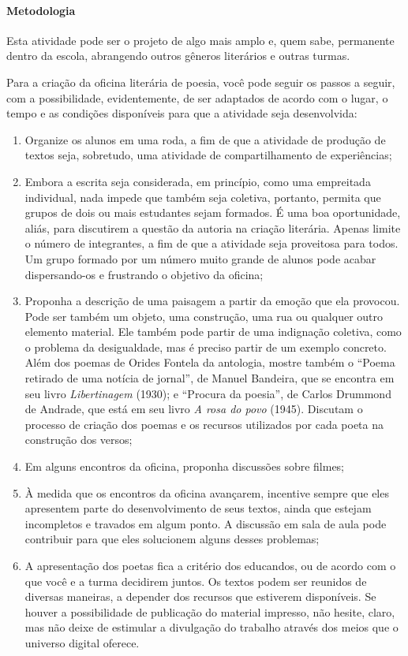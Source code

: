 \documentclass[12pt]{extarticle}
\begin{document}
\paragraph{Metodologia} Esta atividade pode ser o projeto de algo mais
amplo e, quem sabe, permanente dentro da escola, abrangendo outros
gêneros literários e outras turmas.

Para a criação da oficina literária de poesia, você pode seguir os
passos a seguir, com a possibilidade, evidentemente, de ser adaptados de
acordo com o lugar, o tempo e as condições disponíveis para que a
atividade seja desenvolvida:

\begin{enumerate}
\item
  Organize os alunos em uma roda, a fim de que a atividade de produção
  de textos seja, sobretudo, uma atividade de compartilhamento de
  experiências;
\item
  Embora a escrita seja considerada, em princípio, como uma empreitada
  individual, nada impede que também seja coletiva, portanto, permita
  que grupos de dois ou mais estudantes sejam formados. É uma boa
  oportunidade, aliás, para discutirem a questão da autoria na criação
  literária. Apenas limite o número de integrantes, a fim de que a
  atividade seja proveitosa para todos. Um grupo formado por um número
  muito grande de alunos pode acabar dispersando-os e frustrando o
  objetivo da oficina;
\item
  Proponha a descrição de uma paisagem a partir da emoção que ela
  provocou. Pode ser também um objeto, uma construção, uma rua ou
  qualquer outro elemento material. Ele também pode partir de uma
  indignação coletiva, como o problema da desigualdade, mas é preciso
  partir de um exemplo concreto. Além dos poemas de Orides Fontela da
  antologia, mostre também o ``Poema retirado de uma notícia de
  jornal'', de Manuel Bandeira, que se encontra em seu livro
  \emph{Libertinagem} (1930); e ``Procura da poesia'', de Carlos
  Drummond de Andrade, que está em seu livro \emph{A rosa do povo}
  (1945). Discutam o processo de criação dos poemas e os recursos
  utilizados por cada poeta na construção dos versos;
\item
  Em alguns encontros da oficina, proponha discussões sobre filmes;
\item
  À medida que os encontros da oficina avançarem, incentive sempre que
  eles apresentem parte do desenvolvimento de seus textos, ainda que
  estejam incompletos e travados em algum ponto. A discussão em sala de
  aula pode contribuir para que eles solucionem alguns desses problemas;
\item
  A apresentação dos poetas fica a critério dos educandos, ou de acordo
  com o que você e a turma decidirem juntos. Os textos podem ser
  reunidos de diversas maneiras, a depender dos recursos que estiverem
  disponíveis. Se houver a possibilidade de publicação do material
  impresso, não hesite, claro, mas não deixe de estimular a divulgação
  do trabalho através dos meios que o universo digital oferece.
\end{enumerate}
\end{document}
